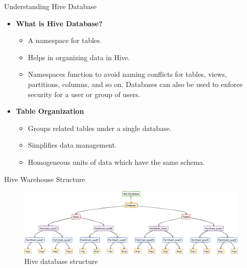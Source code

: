 \begin{frame}[fragile]{Understanding Hive Database}
	\begin{itemize}
	  \item \textbf{What is Hive Database?}
		\begin{itemize}
		  \item A namespace for tables.
		  \item Helps in organizing data in Hive.
		  \item Namespaces function to avoid naming conflicts for tables, views, partitions, columns, and so on.  Databases can also be used to enforce security for a user or group of users.
		\end{itemize}
	  
	  \item \textbf{Table Organization}
		\begin{itemize}
		  \item Groups related tables under a single database.
		  \item Simplifies data management.
		  \item Homogeneous units of data which have the same schema.
		\end{itemize}
		
	\end{itemize}
  \end{frame}
\begin{frame}[fragile]{Hive Warehouse Structure}
\begin{figure}
\includegraphics[width=\textwidth,height=.75\textheight]{./Figures/chapter-03/mermaid-diagram-hive_db.png}

\caption{Hive database structure}	
\end{figure}
\end{frame}
